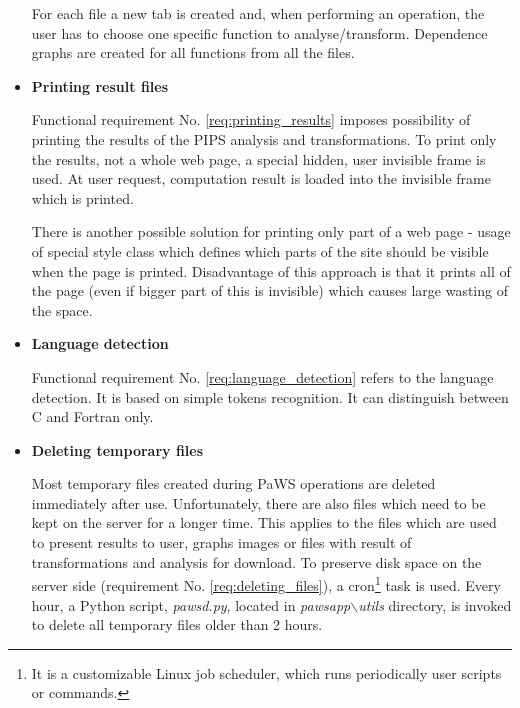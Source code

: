 \begin{itemize}
  For each file a new tab is created and, when performing an operation, the user has to choose one specific function to analyse/transform. Dependence graphs are created for all functions from all the files.
  
  \item {\bf Printing result files}
  
  Functional requirement No. \ref{req:printing_results} imposes possibility of printing the results of the PIPS analysis and transformations. To print only the results, not a whole web page, a special hidden, user invisible frame is used. At user request, computation result is loaded into the invisible frame which is printed. 
  
  There is another possible solution for printing only part of a web page - usage of special style class which defines which parts of the site should be visible when the page is printed. Disadvantage of this approach is that it prints all of the page (even if bigger part of this is invisible) which causes large wasting of the space.
  
  \item {\bf Language detection}
  
  Functional requirement No. \ref{req:language_detection} refers to the language detection. It is based on simple tokens recognition. It can distinguish between C and Fortran only. 

  
  \item {\bf Deleting temporary files}
  
  Most temporary files created during PaWS operations are deleted immediately after use. Unfortunately, there are also files which need to be kept on the server for a longer time. This applies to the files which are used to present results to user, graphs images or files with result of transformations and analysis for download. To preserve disk space on the server side (requirement No. \ref{req:deleting_files}), a cron\footnote{It is a customizable Linux job scheduler, which runs periodically user scripts or commands\cite{cron}.} task is used. Every hour, a Python script, \emph{pawsd.py}, located in \emph{pawsapp$\backslash$utils} directory, is invoked to delete all temporary files older than 2 hours.
  
\end{itemize}
